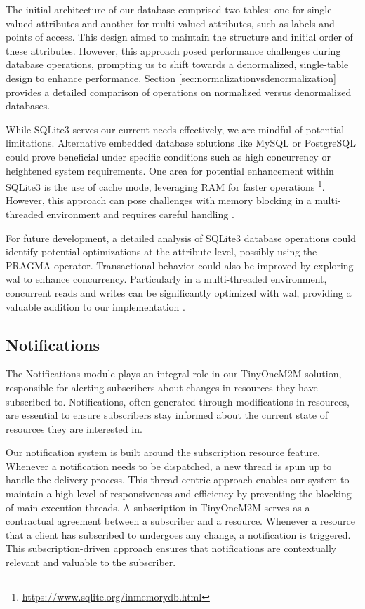 \documentclass[a4paper,fleqn]{cas-dc}
\begin{document}
The initial architecture of our database comprised two tables: one for single-valued attributes and another for multi-valued attributes, such as labels and points of access. This design aimed to maintain the structure and initial order of these attributes. However, this approach posed performance challenges during database operations, prompting us to shift towards a denormalized, single-table design to enhance performance. Section \ref{sec:normalizationvsdenormalization} provides a detailed comparison of operations on normalized versus denormalized databases.

While SQLite3 serves our current needs effectively, we are mindful of potential limitations. Alternative embedded database solutions like MySQL or PostgreSQL could prove beneficial under specific conditions such as high concurrency or heightened system requirements. One area for potential enhancement within SQLite3 is the use of cache mode, leveraging RAM for faster operations \footnote{\url{https://www.sqlite.org/inmemorydb.html}}. However, this approach can pose challenges with memory blocking in a multi-threaded environment and requires careful handling \cite{Jula2019}.

For future development, a detailed analysis of SQLite3 database operations could identify potential optimizations at the attribute level, possibly using the PRAGMA operator. Transactional behavior could also be improved by exploring \gls{wal} to enhance concurrency. Particularly in a multi-threaded environment, concurrent reads and writes can be significantly optimized with \gls{wal}, providing a valuable addition to our implementation \cite{kim_atomic_2017}.

\subsection{Notifications}

The Notifications module plays an integral role in our TinyOneM2M solution, responsible for alerting subscribers about changes in resources they have subscribed to. Notifications, often generated through modifications in resources, are essential to ensure subscribers stay informed about the current state of resources they are interested in.

Our notification system is built around the subscription resource feature. Whenever a notification needs to be dispatched, a new thread is spun up to handle the delivery process. This thread-centric approach enables our system to maintain a high level of responsiveness and efficiency by preventing the blocking of main execution threads. A subscription in TinyOneM2M serves as a contractual agreement between a subscriber and a resource. Whenever a resource that a client has subscribed to undergoes any change, a notification is triggered. This subscription-driven approach ensures that notifications are contextually relevant and valuable to the subscriber.
\end{document}

